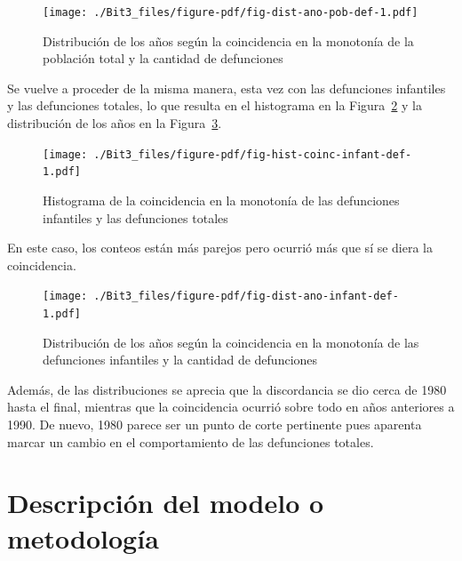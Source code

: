 \documentclass[
  letterpaper,
  onepage,
  openany]{report}
\begin{document}
\begin{figure}[H]

{\centering \texttt{[image: ./Bit3\_files/figure-pdf/fig-dist-ano-pob-def-1.pdf]}

}

\caption{\label{fig-dist-ano-pob-def}Distribución de los años según la
coincidencia en la monotonía de la población total y la cantidad de
defunciones}

\end{figure}

Se vuelve a proceder de la misma manera, esta vez con las defunciones
infantiles y las defunciones totales, lo que resulta en el histograma en
la Figura~\ref{fig-hist-coinc-infant-def} y la distribución de los años
en la Figura~\ref{fig-dist-ano-infant-def}.

\begin{figure}[H]

{\centering \texttt{[image: ./Bit3\_files/figure-pdf/fig-hist-coinc-infant-def-1.pdf]}

}

\caption{\label{fig-hist-coinc-infant-def}Histograma de la coincidencia
en la monotonía de las defunciones infantiles y las defunciones totales}

\end{figure}

En este caso, los conteos están más parejos pero ocurrió más que sí se
diera la coincidencia.

\begin{figure}[H]

{\centering \texttt{[image: ./Bit3\_files/figure-pdf/fig-dist-ano-infant-def-1.pdf]}

}

\caption{\label{fig-dist-ano-infant-def}Distribución de los años según
la coincidencia en la monotonía de las defunciones infantiles y la
cantidad de defunciones}

\end{figure}

Además, de las distribuciones se aprecia que la discordancia se dio
cerca de 1980 hasta el final, mientras que la coincidencia ocurrió sobre
todo en años anteriores a 1990. De nuevo, 1980 parece ser un punto de
corte pertinente pues aparenta marcar un cambio en el comportamiento de
las defunciones totales.

\hypertarget{descripciuxf3n-del-modelo-o-metodologuxeda}{%
\section{Descripción del modelo o
metodología}\label{descripciuxf3n-del-modelo-o-metodologuxeda}}
\end{document}
